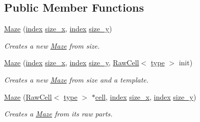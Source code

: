 \subsection*{Public Member Functions}
\begin{DoxyCompactItemize}
\item 
\hyperlink{classmaze_1_1Maze_aef611081ed7197864535e22586a58ff7}{Maze} (\hyperlink{namespacemaze_ae8120a098fabafbbfa264a3c619640b3}{index} \hyperlink{classmaze_1_1Maze_a4b7e051645e4dfd8d06ba7f4a0c0a6f4}{size\+\_\+x}, \hyperlink{namespacemaze_ae8120a098fabafbbfa264a3c619640b3}{index} \hyperlink{classmaze_1_1Maze_af00b31bf815cb59847190984da46bd87}{size\+\_\+y})
\begin{DoxyCompactList}\small\item\em Creates a new \hyperlink{classmaze_1_1Maze}{Maze} from size. \end{DoxyCompactList}\item 
\hyperlink{classmaze_1_1Maze_a43bdce0a7eca808b51174a005c5840c4}{Maze} (\hyperlink{namespacemaze_ae8120a098fabafbbfa264a3c619640b3}{index} \hyperlink{classmaze_1_1Maze_a4b7e051645e4dfd8d06ba7f4a0c0a6f4}{size\+\_\+x}, \hyperlink{namespacemaze_ae8120a098fabafbbfa264a3c619640b3}{index} \hyperlink{classmaze_1_1Maze_af00b31bf815cb59847190984da46bd87}{size\+\_\+y}, \hyperlink{classmaze_1_1RawCell}{Raw\+Cell}$<$ \hyperlink{classmaze_1_1Maze_a9f056be7a10507d578e4608e31a3d6fc}{type} $>$ init)
\begin{DoxyCompactList}\small\item\em Creates a new \hyperlink{classmaze_1_1Maze}{Maze} from size and a template. \end{DoxyCompactList}\item 
\hyperlink{classmaze_1_1Maze_a703176967ecf07e5a2de6fc28f1cfa04}{Maze} (\hyperlink{classmaze_1_1RawCell}{Raw\+Cell}$<$ \hyperlink{classmaze_1_1Maze_a9f056be7a10507d578e4608e31a3d6fc}{type} $>$ $\ast$\hyperlink{classmaze_1_1Maze_ae538f5777c03216dddbdbd8da5623ca9}{cell}, \hyperlink{namespacemaze_ae8120a098fabafbbfa264a3c619640b3}{index} \hyperlink{classmaze_1_1Maze_a4b7e051645e4dfd8d06ba7f4a0c0a6f4}{size\+\_\+x}, \hyperlink{namespacemaze_ae8120a098fabafbbfa264a3c619640b3}{index} \hyperlink{classmaze_1_1Maze_af00b31bf815cb59847190984da46bd87}{size\+\_\+y})
\begin{DoxyCompactList}\small\item\em Creates a \hyperlink{classmaze_1_1Maze}{Maze} from its raw parts. \end{DoxyCompactList}\item 

\end{DoxyCompactItemize}
